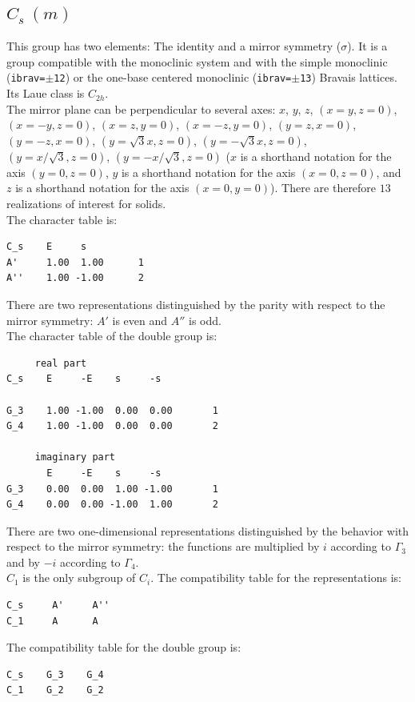 \documentclass[12pt,a4paper]{article}
\begin{document}
\subsection{\color{web-blue}$C_s\ (m)$}
This group has two elements: The identity and a mirror symmetry ($\sigma$).
It is a group compatible with the monoclinic system and with the
simple monoclinic (\texttt{ibrav=$\pm$12}) or the one-base centered monoclinic 
(\texttt{ibrav=$\pm$13}) Bravais lattices. \\
Its Laue class is $C_{2h}$. \\
The mirror plane can be perpendicular to several axes:  
$x$, $y$, $z$, $(x=y, z=0)$, $(x=-y, z=0)$, $(x=z, y=0)$, $(x=-z, y=0)$,
$(y=z, x=0)$, $(y=-z, x=0)$, $(y=\sqrt{3}x, z=0)$, $(y=-\sqrt{3}x, z=0)$, 
$(y=x/\sqrt{3}, z=0)$, $(y=-x/\sqrt{3}, z=0)$ ($x$ is a shorthand notation for
the axis $(y=0, z=0)$, $y$ is a shorthand notation for
the axis $(x=0, z=0)$, and $z$ is a shorthand notation for
the axis $(x=0, y=0)$). There are therefore $13$ 
realizations of interest for solids. \\
The character table is:
\begin{verbatim}
C_s    E     s
A'     1.00  1.00      1
A''    1.00 -1.00      2
\end{verbatim}
There are two representations distinguished by the parity
with respect to the mirror symmetry: $A'$ is even and $A''$ is odd.\\
The character table of the double group is:
\begin{verbatim}
     real part
C_s    E     -E    s     -s   
                              
G_3    1.00 -1.00  0.00  0.00       1 
G_4    1.00 -1.00  0.00  0.00       2

     imaginary part
       E     -E    s     -s   
G_3    0.00  0.00  1.00 -1.00       1
G_4    0.00  0.00 -1.00  1.00       2
\end{verbatim}
There are two one-dimensional representations distinguished by the 
behavior with respect to the mirror symmetry: the functions
are multiplied by $i$ according to $\Gamma_3$ and by
$-i$ according to $\Gamma_4$.\\
$C_1$ is the only subgroup of $C_i$. The compatibility table for the
representations is:
\begin{verbatim}
C_s     A'     A''
C_1     A      A
\end{verbatim}
The compatibility table for the double group is:
\begin{verbatim}
C_s    G_3    G_4 
C_1    G_2    G_2
\end{verbatim}
\end{document}
